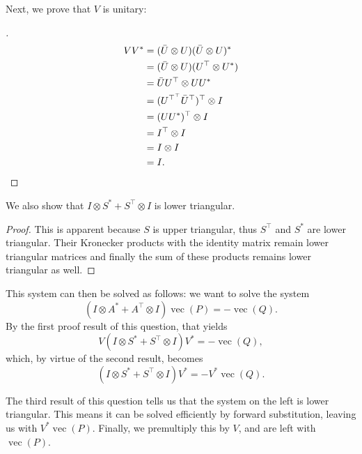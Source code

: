 \documentclass[11pt]{article}
\newcommand{\kp}{\otimes}
\DeclareMathOperator{\vect}{vec}
\begin{document}
Next, we prove that \(V\) is unitary:
\begin{proof}[\leavevmode]
\begin{align*}
   V V^{*} &= (\Bar{U} \kp U) (\Bar{U} \kp U)^{*} \\
   &= (\Bar{U} \kp U) (U^\top \kp U^{*}) \\
   &= \Bar{U} U^\top \kp U U^{*} \\
   &= (U^{\top^\top}  \Bar{U}^\top)^\top \kp I \\
   &= (U U^{*})^\top \kp I \\
   &= I^\top \kp I \\
   &= I \kp I \\
   &= I.\qedhere
\end{align*}
\end{proof}

We also show that $I \kp S^{*} + S^\top \kp I$ is lower triangular.
\begin{proof}
	This is apparent because \(S\) is upper triangular, thus $S^\top$ and $S^{*}$ are lower triangular.
	Their Kronecker products with the identity matrix remain lower triangular matrices and finally the sum of these products remains lower triangular as well.
\end{proof}

This system can then be solved as follows: we want to solve the system
\[
(I \kp A^* + A^\top \kp I) \vect(P) = -\vect(Q).
\]
By the first proof result of this question, that yields
\[
V (I \kp S^* + S^\top \kp I) V^* = -\vect(Q),
\]
which, by virtue of the second result, becomes
\[
(I \kp S^* + S^\top \kp I) V^* = - V^*\vect(Q).
\]

The third result of this question tells us that the system on the left is lower triangular.
This means it can be solved efficiently by forward substitution, leaving us with \(V^* \vect(P)\).
Finally, we premultiply this by \(V\), and are left with \(\vect(P)\).
\end{document}
